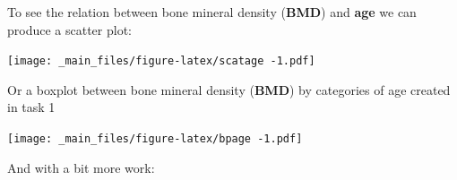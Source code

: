 \documentclass[
]{book}
\newenvironment{Shaded}{\begin{snugshade}}{\end{snugshade}}
\newcommand{\CommentTok}[1]{\textcolor[rgb]{0.56,0.35,0.01}{\textit{#1}}}
\newcommand{\FunctionTok}[1]{\textcolor[rgb]{0.00,0.00,0.00}{#1}}
\newcommand{\NormalTok}[1]{#1}
\newcommand{\SpecialCharTok}[1]{\textcolor[rgb]{0.00,0.00,0.00}{#1}}
\begin{document}
To see the relation between bone mineral density (\textbf{BMD}) and \textbf{age} we
can produce a scatter plot:

\begin{Shaded}
\end{Shaded}

\texttt{[image: \_main\_files/figure-latex/scatage -1.pdf]}

Or a boxplot between bone mineral density (\textbf{BMD}) by categories of age created
in task 1

\begin{Shaded}
\end{Shaded}

\texttt{[image: \_main\_files/figure-latex/bpage -1.pdf]}

And with a bit more work:
\end{document}

